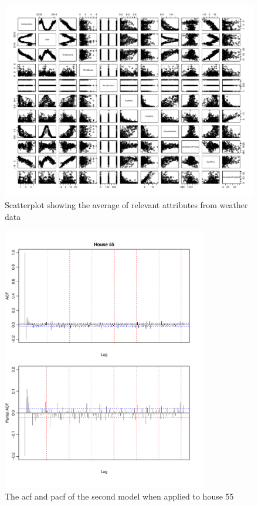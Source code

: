 \begin{figure}
    \centering
    \includegraphics[width=1.3\textwidth, angle = 90]{../../../figures/weather_cons.pdf}
    \caption{Scatterplot showing the average of relevant attributes from weather data}
    \label{fig: weather_cons}
\end{figure}

\begin{figure}
    \centering
    \includegraphics[width=0.8\textwidth]{../../../figures/arimax/ACF_55_long.pdf}
    \caption{The acf and pacf of the second model when applied to house 55}
    \label{fig:Model2_acf_55_long}
\end{figure}    


